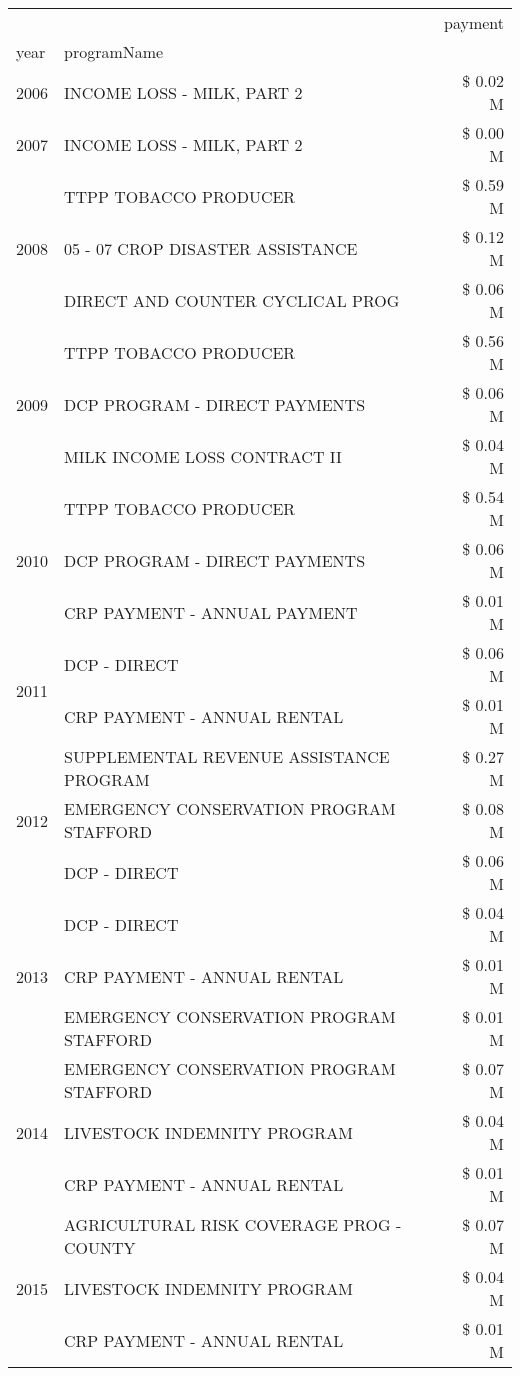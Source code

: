 \begin{tabular}{llr}
\toprule
 &  & payment \\
year & programName &  \\
\midrule
2006 & INCOME LOSS - MILK, PART 2 & \$ 0.02 M \\
\cline{1-3}
2007 & INCOME LOSS - MILK, PART 2 & \$ 0.00 M \\
\cline{1-3}
\multirow[t]{3}{*}{2008} & TTPP TOBACCO PRODUCER & \$ 0.59 M \\
 & 05 - 07 CROP DISASTER ASSISTANCE & \$ 0.12 M \\
 & DIRECT AND COUNTER CYCLICAL PROG & \$ 0.06 M \\
\cline{1-3}
\multirow[t]{3}{*}{2009} & TTPP TOBACCO PRODUCER & \$ 0.56 M \\
 & DCP PROGRAM - DIRECT PAYMENTS & \$ 0.06 M \\
 & MILK INCOME LOSS CONTRACT II & \$ 0.04 M \\
\cline{1-3}
\multirow[t]{3}{*}{2010} & TTPP TOBACCO PRODUCER & \$ 0.54 M \\
 & DCP PROGRAM - DIRECT PAYMENTS & \$ 0.06 M \\
 & CRP PAYMENT - ANNUAL PAYMENT & \$ 0.01 M \\
\cline{1-3}
\multirow[t]{2}{*}{2011} & DCP - DIRECT & \$ 0.06 M \\
 & CRP PAYMENT - ANNUAL RENTAL & \$ 0.01 M \\
\cline{1-3}
\multirow[t]{3}{*}{2012} & SUPPLEMENTAL REVENUE ASSISTANCE PROGRAM & \$ 0.27 M \\
 & EMERGENCY CONSERVATION PROGRAM STAFFORD & \$ 0.08 M \\
 & DCP - DIRECT & \$ 0.06 M \\
\cline{1-3}
\multirow[t]{3}{*}{2013} & DCP - DIRECT & \$ 0.04 M \\
 & CRP PAYMENT - ANNUAL RENTAL & \$ 0.01 M \\
 & EMERGENCY CONSERVATION PROGRAM STAFFORD & \$ 0.01 M \\
\cline{1-3}
\multirow[t]{3}{*}{2014} & EMERGENCY CONSERVATION PROGRAM STAFFORD & \$ 0.07 M \\
 & LIVESTOCK INDEMNITY PROGRAM & \$ 0.04 M \\
 & CRP PAYMENT - ANNUAL RENTAL & \$ 0.01 M \\
\cline{1-3}
\multirow[t]{3}{*}{2015} & AGRICULTURAL RISK COVERAGE PROG - COUNTY & \$ 0.07 M \\
 & LIVESTOCK INDEMNITY PROGRAM & \$ 0.04 M \\
 & CRP PAYMENT - ANNUAL RENTAL & \$ 0.01 M \\

\end{tabular}

